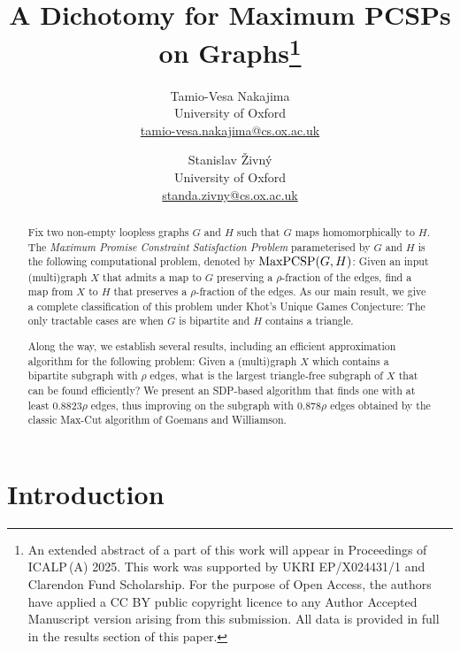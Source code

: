 \documentclass[a4paper,11pt, DIV=11]{scrartcl}
\DeclareMathOperator{\maxPCSP}{\textup{MaxPCSP}}
\theoremstyle{plain}
\theoremstyle{definition}
\begin{document}
\title{A Dichotomy for Maximum PCSPs on Graphs\thanks{An extended abstract of a part of this work will appear in Proceedings of ICALP\,(A) 2025. This work was supported by UKRI EP/X024431/1 and Clarendon Fund Scholarship. For the purpose of Open Access, the authors have applied a CC BY public copyright licence to any Author Accepted Manuscript version arising from this submission. All data is provided in full in the results section of this paper.}}

\author{Tamio-Vesa Nakajima\\
University of Oxford\\
\url{tamio-vesa.nakajima@cs.ox.ac.uk}
\and
Stanislav \v{Z}ivn\'y\\
University of Oxford\\
\url{standa.zivny@cs.ox.ac.uk}
}

\date{} 

\maketitle


\begin{abstract}
Fix two non-empty loopless graphs $G$ and $H$ such that $G$ maps homomorphically to $H$. The \emph{Maximum Promise Constraint Satisfaction Problem} parameterised by $G$ and $H$ is the following computational problem, denoted by $\maxPCSP(G, H)$: Given an input (multi)graph $X$ that admits a map to $G$ preserving a $\rho$-fraction of the edges, find a map from $X$ to $H$ that preserves a $\rho$-fraction of the edges. As our main result, we give a complete classification of this problem under Khot's Unique Games Conjecture: The only tractable cases are when $G$ is bipartite and $H$ contains a triangle. 

Along the way, we establish several results, including an efficient approximation algorithm for the following problem: Given a (multi)graph $X$ which contains a bipartite subgraph with $\rho$ edges, what is the largest triangle-free subgraph of $X$ that can be found efficiently? We present an SDP-based algorithm that finds one with at least $0.8823 \rho$ edges, thus improving on the subgraph with $0.878 \rho$ edges  obtained by the classic Max-Cut algorithm of Goemans and Williamson.

\end{abstract}


\section{Introduction}
\end{document}
